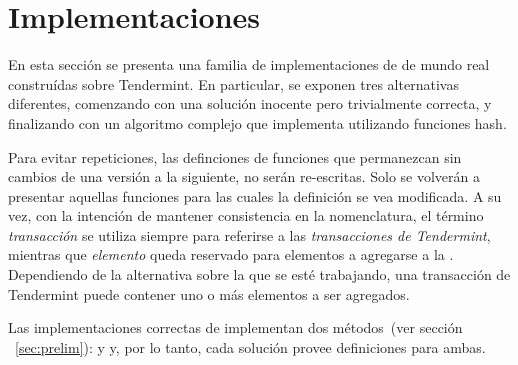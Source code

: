 \section{Implementaciones}\label{sec:impl}

En esta sección se presenta una familia de implementaciones de \setchain de mundo
real construídas sobre Tendermint. 
%
En particular, se exponen tres alternativas diferentes, comenzando con una
solución inocente pero
trivialmente correcta, y finalizando con un algoritmo
complejo que implementa \setchain utilizando funciones hash.
%

Para evitar repeticiones, las definciones de funciones que permanezcan sin cambios
de una versión a la siguiente, no serán re-escritas. Solo se volverán a presentar
aquellas funciones para las cuales la definición se vea modificada.
%
A su vez, con la intención de mantener consistencia en la nomenclatura, el término \textit{transacción}
se utiliza siempre para referirse a las \textit{transacciones de Tendermint}, mientras
que \textit{elemento} queda reservado para elementos a agregarse a la \setchain.
%
Dependiendo de la alternativa sobre la que se esté trabajando, una transacción de
Tendermint puede contener uno
o más elementos a ser agregados.


Las implementaciones correctas de \setchain implementan dos métodos~(ver sección
~\ref{sec:prelim}): \Add y \Get y, por lo tanto, cada solución provee definiciones
para ambas.
%

